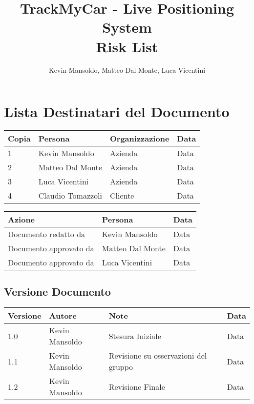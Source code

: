 \documentclass[a4paper,12pt]{article}
\begin{document}
\title{\textbf{TrackMyCar - Live Positioning System} \\ Risk List}

\author{Kevin Mansoldo, Matteo Dal Monte, Luca Vicentini}
\date{}
\maketitle
\pagebreak

\tableofcontents
\pagebreak

\section{Lista Destinatari del Documento}

\begin{table*}[ht]
\begin{center}
\begin{tabular}{p{1cm} p{4.5cm} p{5cm} p{2cm}}
\rowcolor{Ash}
\hline
Copia & Persona & Organizzazione & Data \\ \hline
1 & Kevin Mansoldo & Azienda & Data \\ 
2 & Matteo Dal Monte & Azienda & Data \\ 
3 & Luca Vicentini & Azienda & Data \\ 
4 & Claudio Tomazzoli & Cliente & Data \\ \hline
\end{tabular}
\end{center}


\begin{center}
\begin{tabular}{p{6cm} p{5cm} p{2cm}}
\rowcolor{Ash}
\hline
Azione & Persona & Data \\ \hline
Documento redatto da & Kevin Mansoldo & Data \\ 
Documento approvato da & Matteo Dal Monte & Data \\ 
Documento approvato da & Luca Vicentini & Data \\ \hline
\end{tabular}
\end{center}
\end{table*}

\subsection{Versione Documento}
\begin{table*}[ht]
\begin{center}
\begin{tabular}{p{1cm} p{4.5cm} p{5cm} p{2cm}}
\rowcolor{Ash}
\hline
Versione & Autore & Note & Data \\ \hline
1.0 & Kevin Mansoldo & Stesura Iniziale & Data \\ 
1.1 & Kevin Mansoldo & Revisione su osservazioni del gruppo & Data \\ 
1.2 & Kevin Mansoldo & Revisione Finale & Data \\ \hline
\end{tabular}
\end{center}
\end{table*}
\end{document}
